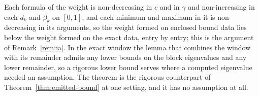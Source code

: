 
Each formula of the weight is non-decreasing in $c$ and in $\gamma$ and
non-increasing in each $d_k$ and $\beta_k$ on $[0,1]$, and each minimum and
maximum in it is non-decreasing in its arguments, so the weight formed on
enclosed bound data lies below the weight formed on the exact data, entry by
entry; this is the argument of Remark~\ref{rem:ia}. In the exact window the
lemma that combines the window with its remainder admits any lower bounds on
the block eigenvalues and any lower remainder, so a rigorous lower bound
serves where a computed eigenvalue needed an assumption. The theorem is the
rigorous counterpart of Theorem~\ref{thm:emitted-bound} at one setting, and it
has no assumption at all.


